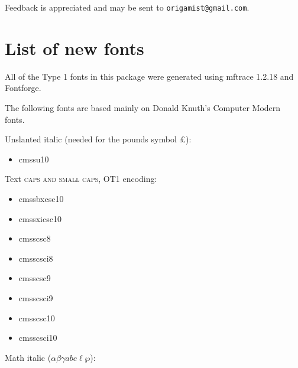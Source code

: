 \documentclass{amsart}
\begin{document}
Feedback is appreciated and may be sent to \texttt{origamist@gmail.com}.




\section{List of new fonts}\label{sec:fonts}

All of the Type 1 fonts in this package were generated using mftrace 1.2.18 and Fontforge.

The following fonts are based mainly on Donald Knuth's Computer Modern fonts.

\textsf{\selectfont Unslanted italic} (needed for the pounds symbol \textsf{\pounds}):
\begin{itemize}
\item \textsf{cmssu10}
\end{itemize}

Text \textsf{\textsc{caps and small caps}}, OT1 encoding:

\nobreak

\noindent\parbox[t]{0.25\textwidth}{
\begin{itemize}
\item \textsf{cmssbxcsc10}
\item \textsf{cmssxicsc10}
\end{itemize}}\parbox[t]{0.25\textwidth}{\begin{itemize}
\item \textsf{cmsscsc8}
\item \textsf{cmsscsci8}
\end{itemize}}\parbox[t]{0.25\textwidth}{\begin{itemize}
\item \textsf{cmsscsc9}
\item \textsf{cmsscsci9}
\end{itemize}}\parbox[t]{0.25\textwidth}{\begin{itemize}
\item \textsf{cmsscsc10}
\item \textsf{cmsscsci10}
\end{itemize}}

\bigskip

Math italic ($\alpha \beta \gamma abc \ell \wp$):

\nobreak
\end{document}
